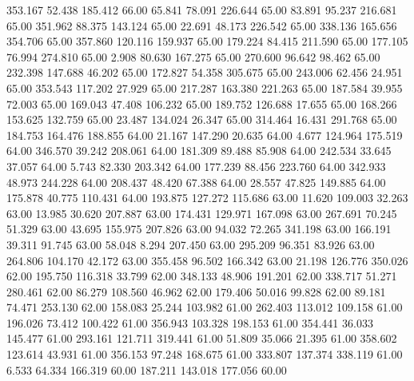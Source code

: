  353.167   52.438  185.412        66.00
  65.841   78.091  226.644        65.00
  83.891   95.237  216.681        65.00
 351.962   88.375  143.124        65.00
  22.691   48.173  226.542        65.00
 338.136  165.656  354.706        65.00
 357.860  120.116  159.937        65.00
 179.224   84.415  211.590        65.00
 177.105   76.994  274.810        65.00
   2.908   80.630  167.275        65.00
 270.600   96.642   98.462        65.00
 232.398  147.688   46.202        65.00
 172.827   54.358  305.675        65.00
 243.006   62.456   24.951        65.00
 353.543  117.202   27.929        65.00
 217.287  163.380  221.263        65.00
 187.584   39.955   72.003        65.00
 169.043   47.408  106.232        65.00
 189.752  126.688   17.655        65.00
 168.266  153.625  132.759        65.00
  23.487  134.024   26.347        65.00
 314.464   16.431  291.768        65.00
 184.753  164.476  188.855        64.00
  21.167  147.290   20.635        64.00
   4.677  124.964  175.519        64.00
 346.570   39.242  208.061        64.00
 181.309   89.488   85.908        64.00
 242.534   33.645   37.057        64.00
   5.743   82.330  203.342        64.00
 177.239   88.456  223.760        64.00
 342.933   48.973  244.228        64.00
 208.437   48.420   67.388        64.00
  28.557   47.825  149.885        64.00
 175.878   40.775  110.431        64.00
 193.875  127.272  115.686        63.00
  11.620  109.003   32.263        63.00
  13.985   30.620  207.887        63.00
 174.431  129.971  167.098        63.00
 267.691   70.245   51.329        63.00
  43.695  155.975  207.826        63.00
  94.032   72.265  341.198        63.00
 166.191   39.311   91.745        63.00
  58.048    8.294  207.450        63.00
 295.209   96.351   83.926        63.00
 264.806  104.170   42.172        63.00
 355.458   96.502  166.342        63.00
  21.198  126.776  350.026        62.00
 195.750  116.318   33.799        62.00
 348.133   48.906  191.201        62.00
 338.717   51.271  280.461        62.00
  86.279  108.560   46.962        62.00
 179.406   50.016   99.828        62.00
  89.181   74.471  253.130        62.00
 158.083   25.244  103.982        61.00
 262.403  113.012  109.158        61.00
 196.026   73.412  100.422        61.00
 356.943  103.328  198.153        61.00
 354.441   36.033  145.477        61.00
 293.161  121.711  319.441        61.00
  51.809   35.066   21.395        61.00
 358.602  123.614   43.931        61.00
 356.153   97.248  168.675        61.00
 333.807  137.374  338.119        61.00
   6.533   64.334  166.319        60.00
 187.211  143.018  177.056        60.00
